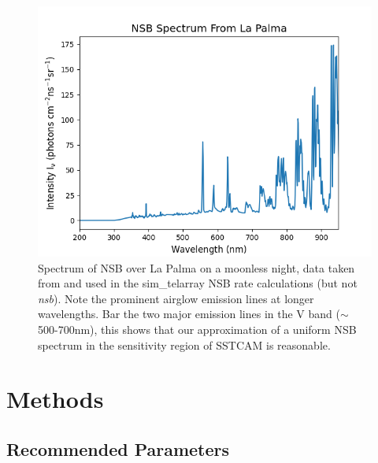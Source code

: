 \begin{figure}[ht]
\begin{centering}
\includegraphics[width=\columnwidth]{./figures/bandeplot.png}
\caption{Spectrum of NSB over La Palma on a moonless night, data taken from \cite{BandE} and used in the sim\_telarray NSB rate calculations (but not \textit{nsb}). Note the prominent airglow emission lines at longer wavelengths. Bar the two major emission lines in the V band ($\sim$ 500-700nm), this shows that our approximation of a uniform NSB spectrum in the sensitivity region of SSTCAM is reasonable.}
\label{fig:BandE}
\end{centering}
\end{figure}

\section{Methods}


\subsection{Recommended Parameters}
\label{sec:examples:params}

